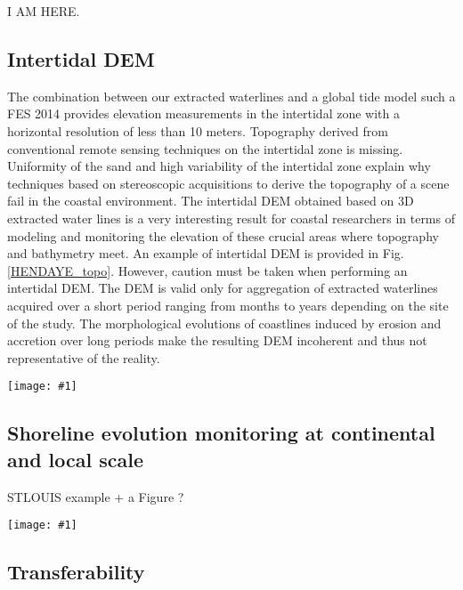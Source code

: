 \documentclass[remotesensing,article,submit,pdftex,moreauthors]{Definitions/mdpi}
\newcommand{\myfigure}[4]{
    \begin{figure*}[h!]
        \centering
        \texttt{[image: \#1]}	 
        \caption{\itshape#2}
        \label{#3}
    \end{figure*} 
}
\begin{document}
I AM HERE.




\subsection{Intertidal DEM}
The combination between our extracted waterlines and a global tide model such a FES 2014 \citep{carrere2016fes} provides elevation measurements in the intertidal zone with a horizontal resolution of less than 10 meters.
Topography derived from conventional remote sensing techniques on the intertidal zone is missing.
Uniformity of the sand and high variability of the intertidal zone explain why techniques based on stereoscopic acquisitions to derive the topography of a scene fail in the coastal environment.
The intertidal DEM obtained based on 3D extracted water lines is a very interesting result for coastal researchers in terms of modeling and monitoring the elevation of these crucial areas where topography and bathymetry meet.
An example of intertidal DEM is provided in Fig.\ref{HENDAYE_topo}.
However, caution must be taken when performing an intertidal DEM.
The DEM is valid only for aggregation of extracted waterlines acquired over a short period ranging from months to years depending on the site of the study.
The morphological evolutions of coastlines induced by erosion and accretion over long periods make the resulting DEM incoherent and thus not representative of the reality.

\myfigure{img/HENDAYE_shoreline_DEM.png}{An example of intertidal DEM on Hendaye beach, SW France. It was obtained from the combination of the extracted instantaneous waterlines and the predicted water levels of each waterline point with FES2014 global tide model of Sentinel-2 acquisition from XX to XX.}{HENDAYE_topo}{0.7}

\subsection{Shoreline evolution monitoring at continental and local scale}

STLOUIS example + a Figure ?

\myfigure{img/senegal_stLouis_thinLines.png}{2015-2022 application at St. Louis, Senegal}{senegal}{1}

\subsection{Transferability}
\end{document}
